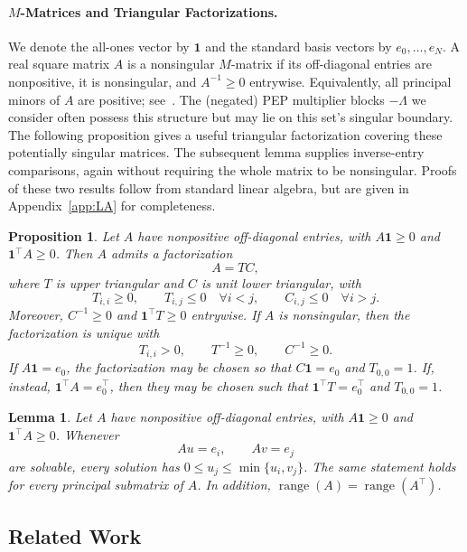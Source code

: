 \documentclass[11pt]{article}
\newtheorem{proposition}[thm]{Proposition}
\newtheorem{lemma}[thm]{Lemma}
\begin{document}
\paragraph{$M$-Matrices and Triangular Factorizations.}
We denote the all-ones vector by $\mathbf{1}$ and the standard basis vectors by $e_0,\dots,e_N$. A real square matrix $A$ is a nonsingular $M$-matrix if its off-diagonal entries are nonpositive, it is nonsingular, and $A^{-1}\geq0$ entrywise. Equivalently, all principal minors of $A$ are positive; see~\cite[Chapter~6, Theorem~2.3]{BermanPlemmons94}. The (negated) PEP multiplier blocks $-\Lambda$ we consider often possess this structure but may lie on this set's singular boundary. The following proposition gives a useful triangular factorization covering these potentially singular matrices. The subsequent lemma supplies inverse-entry comparisons, again without requiring the whole matrix to be nonsingular. Proofs of these two results follow from standard linear algebra, but are given in Appendix~\ref{app:LA} for completeness.

\begin{proposition}
\label{prop:M-matrix-factorization}
Let $A$ have nonpositive off-diagonal entries, with
$A\mathbf1\geq0$ and $\mathbf1^\top A\geq0$. Then $A$ admits a factorization
\[
A=TC,
\]
where $T$ is upper triangular and $C$ is unit lower triangular, with
\[
T_{i,i}\geq0,\qquad
T_{i,j}\leq0 \quad \forall i < j,\qquad
C_{i,j}\leq0 \quad \forall i > j.
\]
Moreover, $C^{-1}\geq0$ and $\mathbf1^\top T\geq0$ entrywise. If $A$ is nonsingular, then the factorization is unique with
\[
T_{i,i}>0,
\qquad
T^{-1}\geq0,
\qquad
C^{-1}\geq0.
\]
If $A\mathbf1=e_0$, the factorization may be chosen so that $C\mathbf1=e_0$ and $T_{0,0}=1$. If, instead, $\mathbf1^\top A=e_0^\top$, then they may be chosen such that $\mathbf1^\top T=e_0^\top$ and $T_{0,0}=1$.
\end{proposition}


\begin{lemma}\label{lem:app-inverse-bound}
Let $A$ have nonpositive off-diagonal entries, with
$A\mathbf1\geq0$ and $\mathbf1^\top A\geq0$. Whenever
\[
Au=e_i,
\qquad
Av=e_j
\]
are solvable, every solution has $0\leq u_j\leq\min\{u_i,v_j\}$.
The same statement holds for every principal submatrix of $A$. In addition, $\operatorname{range}(A)=\operatorname{range}(A^\top)$.
\end{lemma}


\subsection{Related Work}
\end{document}

